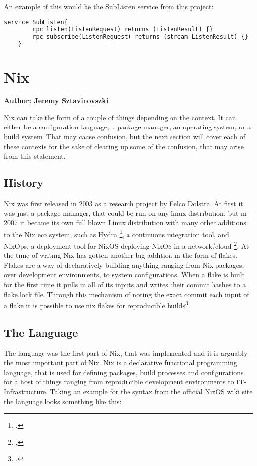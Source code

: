 An example of this would be the SubListen service from this project:

\begin{minipage}{\textwidth}
\begin{lstlisting}[language=ProtoBuf, caption=Example of service definition in Protofiles]
    service SubListen{
        rpc listen(ListenRequest) returns (ListenResult) {}
        rpc subscribe(ListenRequest) returns (stream ListenResult) {}
    }
\end{lstlisting}
\end{minipage}

\section{Nix}
\textbf{Author: Jeremy Sztavinovszki}

Nix can take the form of a couple of things depending on the context. It can either be a configuration language, a package manager, an operating system, or a build system.
That may cause confusion, but the next section will cover each of these contexts for the sake of clearing up some of the confusion, that may arise from this statement.

\subsection{History}
Nix was first released in 2003 as a research project by Eelco Dolstra. At first it was just a package manager, that could be run on any linux distribution, but in 2007 it became its
own full blown Linux distribution with many other additions to the Nix eco system, such as Hydra \footcite{hydra}, a continuous integration tool, and NixOps,
a deployment tool for NixOS deploying NixOS in a network/cloud \footcite{NixOps}. At the time of writing Nix has gotten another big addition in the form of flakes.
Flakes are a way of declaratively building anything ranging from Nix packages, over development environments, to system configurations. When a flake is built for the first time it
pulls in all of its inputs and writes their commit hashes to a flake.lock file. Through this mechanism of noting the exact commit each input of a flake it is possible to use nix flakes for
reproducible builds\footcite{reproducible-builds}.

\subsection{The Language}
The language was the first part of Nix, that was implemented and it is arguably the most important part of Nix. Nix is a declarative functional programming language,
that is used for defining packages, build processes and configurations for a host of things ranging from reproducible development environments to IT-Infrastructure.
Taking an example for the syntax from the official NixOS wiki site the language looks something like this:

